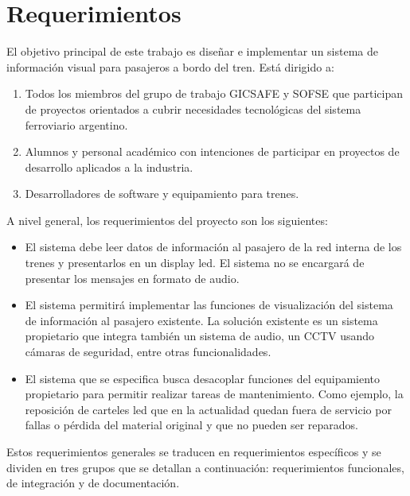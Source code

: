 \section{Requerimientos}

 El objetivo principal de este trabajo es diseñar e implementar un sistema de información visual para pasajeros a bordo del tren. Está dirigido a:
\begin{enumerate}
\item Todos los  miembros del grupo de trabajo GICSAFE y SOFSE que participan de proyectos orientados a cubrir necesidades tecnológicas del sistema ferroviario argentino.
\item Alumnos y personal académico con intenciones de participar en proyectos de desarrollo aplicados a la industria.
\item Desarrolladores de software y equipamiento para trenes.
\end{enumerate}

A nivel general, los requerimientos del proyecto son los siguientes:

\begin{itemize}

\item El sistema debe leer datos de información al pasajero de la red interna de los trenes y presentarlos en un display led. El sistema no se encargará de presentar los mensajes en formato de audio.

\item El sistema permitirá implementar las funciones de visualización del sistema de información al pasajero existente. La solución existente es un sistema propietario que integra también un sistema de audio, un CCTV usando cámaras de seguridad, entre otras funcionalidades. 

\item El sistema que se especifica busca desacoplar funciones del equipamiento propietario para permitir realizar tareas de mantenimiento. Como ejemplo, la reposición de carteles led que en la actualidad quedan fuera de servicio por fallas o pérdida del material original y que no pueden ser reparados. 

\end{itemize}

Estos requerimientos generales se traducen en requerimientos específicos y se dividen en tres grupos que se detallan a continuación: requerimientos funcionales, de integración y de documentación. \\


